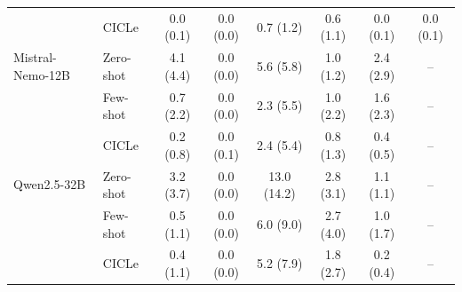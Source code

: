 \begin{tabular}{llcccccc}
 & CICLe & 0.0 (0.1) & 0.0 (0.0) & 0.7 (1.2) & 0.6 (1.1) & 0.0 (0.1) & 0.0 (0.1) \\
\addlinespace
Mistral-Nemo-12B & Zero-shot & 4.1 (4.4) & 0.0 (0.0) & 5.6 (5.8) & 1.0 (1.2) & 2.4 (2.9) & -- \\
 & Few-shot & 0.7 (2.2) & 0.0 (0.0) & 2.3 (5.5) & 1.0 (2.2) & 1.6 (2.3) & -- \\
 & CICLe & 0.2 (0.8) & 0.0 (0.1) & 2.4 (5.4) & 0.8 (1.3) & 0.4 (0.5) & -- \\
\addlinespace
Qwen2.5-32B & Zero-shot & 3.2 (3.7) & 0.0 (0.0) & 13.0 (14.2) & 2.8 (3.1) & 1.1 (1.1) & -- \\
 & Few-shot & 0.5 (1.1) & 0.0 (0.0) & 6.0 (9.0) & 2.7 (4.0) & 1.0 (1.7) & -- \\
 & CICLe & 0.4 (1.1) & 0.0 (0.0) & 5.2 (7.9) & 1.8 (2.7) & 0.2 (0.4) & -- \\
\bottomrule
\end{tabular}
